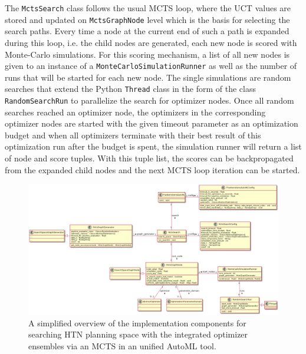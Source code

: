 The \texttt{MctsSearch} class follows the usual MCTS loop, where the UCT values are stored and updated on \texttt{MctsGraphNode} level which is the basis for selecting the search paths.
Every time a node at the current end of such a path is expanded during this loop, i.e. the child nodes are generated, each new node is scored with Monte-Carlo simulations.\newline
For this scoring mechanism, a list of all new nodes is given to an instance of a \texttt{MonteCarloSimulationRunner} as well as the number of runs that will be started for each new node.
The single simulations are random searches that extend the Python \texttt{Thread} class in the form of the class \texttt{RandomSearchRun} to parallelize the search for optimizer nodes.
Once all random searches reached an optimizer node, the optimizers in the corresponding optimizer nodes are started with the given timeout parameter as an optimization budget and when all optimizers terminate with their best result of this optimization run after the budget is spent, the simulation runner will return a list of node and score tuples.
With this tuple list, the scores can be backpropagated from the expanded child nodes and the next MCTS loop iteration can be started.

\begin{figure}[ht!]
    \centering
    \includegraphics[angle=90,origin=c,width=\textwidth,height=0.7\textheight,keepaspectratio]{gfx/Figures/Implementation/mcts/MctsAutoML.png}
    \caption{A simplified overview of the implementation components for searching HTN planning space with the integrated optimizer ensembles via an MCTS in an unified AutoML tool.}
    \label{fig:implementation:uml:mcts}
\end{figure}

